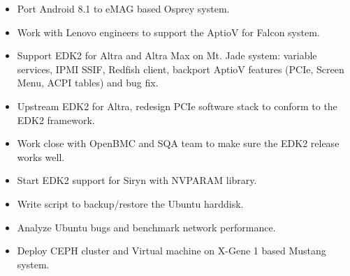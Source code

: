 \documentclass[12pt,a4paper]{altacv}
\begin{document}

\makecvheader


\begin{itemize}
\item Port Android 8.1 to eMAG based Osprey system.
\item Work with Lenovo engineers to support the AptioV for Falcon system.
\item Support EDK2 for Altra and Altra Max on Mt. Jade system: variable services, IPMI SSIF, Redfish client, backport AptioV features (PCIe, Screen Menu, ACPI tables) and bug fix.
\item Upstream EDK2 for Altra, redesign PCIe software stack to conform to the EDK2 framework.
\item Work close with OpenBMC and SQA team to make sure the EDK2 release works well.
\item Start EDK2 support for Siryn with NVPARAM library.
\end{itemize}

\divider

\begin{itemize}
\item Write script to backup/restore the Ubuntu harddisk.
\item Analyze Ubuntu bugs and benchmark network performance.
\item Deploy CEPH cluster and Virtual machine on X-Gene 1 based Mustang system.
\end{itemize}
\end{document}
